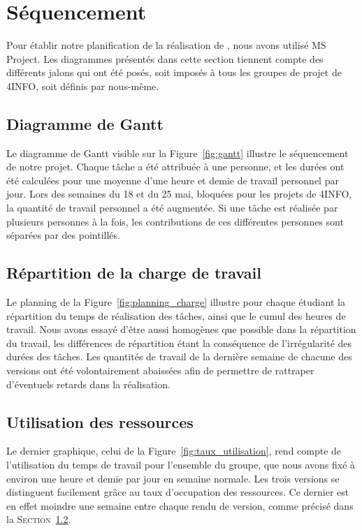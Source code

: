 \section{Séquencement}
	\label{sec:sequencement}
	Pour établir notre planification de la réalisation de \glasir{}, nous avons utilisé MS Project. Les diagrammes présentés dans cette section tiennent compte des différents jalons qui ont été posés, soit imposés à tous les groupes de projet de 4INFO, soit définis par nous-même.

    \subsection{Diagramme de Gantt}
        Le diagramme de Gantt visible sur la {\sc Figure}~\ref{fig:gantt} illustre le séquencement de notre projet. Chaque tâche a été attribuée à une personne, et les durées ont été calculées pour une moyenne d'une heure et demie de travail personnel par jour. Lors des semaines du 18 et du 25 mai, bloquées pour les projets de 4INFO, la quantité de travail personnel a été augmentée. Si une tâche est réalisée par plusieurs personnes à la fois, les contributions de ces différentes personnes sont séparées par des pointillés.
    
    \subsection{Répartition de la charge de travail}
    \label{subsec:repartition_charge}
        Le planning de la {\sc Figure}~\ref{fig:planning_charge} illustre pour chaque étudiant la répartition du temps de réalisation des tâches, ainsi que le cumul des heures de travail. Nous avons essayé d'être aussi homogènes que possible dans la répartition du travail, les différences de répartition étant la conséquence de l'irrégularité des durées des tâches. Les quantités de travail de la dernière semaine de chacune des versions ont été volontairement abaissées afin de permettre de rattraper d'éventuels retards dans la réalisation.

    \subsection{Utilisation des ressources}
		Le dernier graphique, celui de la {\sc Figure}~\ref{fig:taux_utilisation}, rend compte de l'utilisation du temps de travail pour l'ensemble du groupe, que nous avons fixé à environ une heure et demie par jour en semaine normale. Les trois versions se distinguent facilement grâce au taux d'occupation des ressources. Ce dernier est en effet moindre une semaine entre chaque rendu de version, comme précisé dans la \textsc{Section}~\ref{subsec:repartition_charge}.

